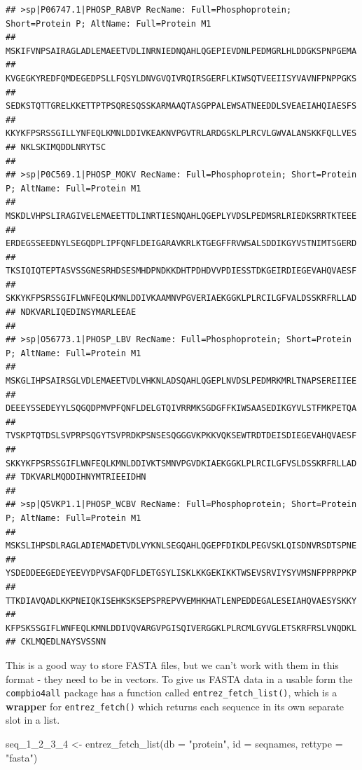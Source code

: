 \documentclass[
]{book}
\newenvironment{Shaded}{\begin{snugshade}}{\end{snugshade}}
\newcommand{\AttributeTok}[1]{\textcolor[rgb]{0.77,0.63,0.00}{#1}}
\newcommand{\FunctionTok}[1]{\textcolor[rgb]{0.00,0.00,0.00}{#1}}
\newcommand{\NormalTok}[1]{#1}
\newcommand{\OtherTok}[1]{\textcolor[rgb]{0.56,0.35,0.01}{#1}}
\newcommand{\StringTok}[1]{\textcolor[rgb]{0.31,0.60,0.02}{#1}}
\begin{document}
\begin{verbatim}
## >sp|P06747.1|PHOSP_RABVP RecName: Full=Phosphoprotein; Short=Protein P; AltName: Full=Protein M1
## MSKIFVNPSAIRAGLADLEMAEETVDLINRNIEDNQAHLQGEPIEVDNLPEDMGRLHLDDGKSPNPGEMA
## KVGEGKYREDFQMDEGEDPSLLFQSYLDNVGVQIVRQIRSGERFLKIWSQTVEEIISYVAVNFPNPPGKS
## SEDKSTQTTGRELKKETTPTPSQRESQSSKARMAAQTASGPPALEWSATNEEDDLSVEAEIAHQIAESFS
## KKYKFPSRSSGILLYNFEQLKMNLDDIVKEAKNVPGVTRLARDGSKLPLRCVLGWVALANSKKFQLLVES
## NKLSKIMQDDLNRYTSC
## 
## >sp|P0C569.1|PHOSP_MOKV RecName: Full=Phosphoprotein; Short=Protein P; AltName: Full=Protein M1
## MSKDLVHPSLIRAGIVELEMAEETTDLINRTIESNQAHLQGEPLYVDSLPEDMSRLRIEDKSRRTKTEEE
## ERDEGSSEEDNYLSEGQDPLIPFQNFLDEIGARAVKRLKTGEGFFRVWSALSDDIKGYVSTNIMTSGERD
## TKSIQIQTEPTASVSSGNESRHDSESMHDPNDKKDHTPDHDVVPDIESSTDKGEIRDIEGEVAHQVAESF
## SKKYKFPSRSSGIFLWNFEQLKMNLDDIVKAAMNVPGVERIAEKGGKLPLRCILGFVALDSSKRFRLLAD
## NDKVARLIQEDINSYMARLEEAE
## 
## >sp|O56773.1|PHOSP_LBV RecName: Full=Phosphoprotein; Short=Protein P; AltName: Full=Protein M1
## MSKGLIHPSAIRSGLVDLEMAEETVDLVHKNLADSQAHLQGEPLNVDSLPEDMRKMRLTNAPSEREIIEE
## DEEEYSSEDEYYLSQGQDPMVPFQNFLDELGTQIVRRMKSGDGFFKIWSAASEDIKGYVLSTFMKPETQA
## TVSKPTQTDSLSVPRPSQGYTSVPRDKPSNSESQGGGVKPKKVQKSEWTRDTDEISDIEGEVAHQVAESF
## SKKYKFPSRSSGIFLWNFEQLKMNLDDIVKTSMNVPGVDKIAEKGGKLPLRCILGFVSLDSSKRFRLLAD
## TDKVARLMQDDIHNYMTRIEEIDHN
## 
## >sp|Q5VKP1.1|PHOSP_WCBV RecName: Full=Phosphoprotein; Short=Protein P; AltName: Full=Protein M1
## MSKSLIHPSDLRAGLADIEMADETVDLVYKNLSEGQAHLQGEPFDIKDLPEGVSKLQISDNVRSDTSPNE
## YSDEDDEEGEDEYEEVYDPVSAFQDFLDETGSYLISKLKKGEKIKKTWSEVSRVIYSYVMSNFPPRPPKP
## TTKDIAVQADLKKPNEIQKISEHKSKSEPSPREPVVEMHKHATLENPEDDEGALESEIAHQVAESYSKKY
## KFPSKSSGIFLWNFEQLKMNLDDIVQVARGVPGISQIVERGGKLPLRCMLGYVGLETSKRFRSLVNQDKL
## CKLMQEDLNAYSVSSNN
\end{verbatim}

This is a good way to store FASTA files, but we can't work with them in this format - they need to be in vectors. To give us FASTA data in a usable form the \texttt{compbio4all} package has a function called \texttt{entrez\_fetch\_list()}, which is a \textbf{wrapper} for \texttt{entrez\_fetch()} which returns each sequence in its own separate slot in a list.

\begin{Shaded}
\begin{Highlighting}[]
\NormalTok{seq\_1\_2\_3\_4 }\OtherTok{\textless{}{-}} \FunctionTok{entrez\_fetch\_list}\NormalTok{(}\AttributeTok{db =} \StringTok{"protein"}\NormalTok{, }
                          \AttributeTok{id =}\NormalTok{ seqnames, }
                          \AttributeTok{rettype =} \StringTok{"fasta"}\NormalTok{)}
\end{Highlighting}
\end{Shaded}
\end{document}
